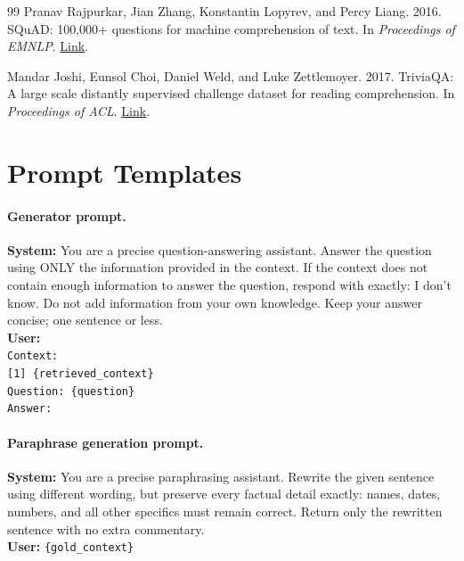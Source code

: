 \documentclass[11pt]{article}
\begin{document}
\begin{thebibliography}{99}
Pranav Rajpurkar, Jian Zhang, Konstantin Lopyrev, and Percy Liang. 2016.
\newblock SQuAD: 100,000+ questions for machine comprehension of text.
\newblock In \emph{Proceedings of EMNLP}.
\newblock \href{https://aclanthology.org/D16-1264/}{Link}.

Mandar Joshi, Eunsol Choi, Daniel Weld, and Luke Zettlemoyer. 2017.
\newblock TriviaQA: A large scale distantly supervised challenge dataset for reading
comprehension.
\newblock In \emph{Proceedings of ACL}.
\newblock \href{https://aclanthology.org/P17-1147/}{Link}.

\end{thebibliography}
\endgroup
\appendix

\FloatBarrier
\section{Prompt Templates}
\label{app:prompts}

\paragraph{Generator prompt.}
\begin{examplebox}
\small
\textbf{System:} You are a precise question-answering assistant. Answer the question
using ONLY the information provided in the context. If the context does not contain
enough information to answer the question, respond with exactly: I don't know. Do not
add information from your own knowledge. Keep your answer concise; one sentence or
less.\\[6pt]
\textbf{User:}\\
\texttt{Context:}\\
\texttt{[1] \{retrieved\_context\}}\\[4pt]
\texttt{Question: \{question\}}\\[4pt]
\texttt{Answer:}
\end{examplebox}

\paragraph{Paraphrase generation prompt.}
\begin{examplebox}
\small
\textbf{System:} You are a precise paraphrasing assistant. Rewrite the given sentence
using different wording, but preserve every factual detail exactly: names, dates,
numbers, and all other specifics must remain correct. Return only the rewritten sentence
with no extra commentary.\\[6pt]
\textbf{User:} \texttt{\{gold\_context\}}
\end{examplebox}
\end{document}
